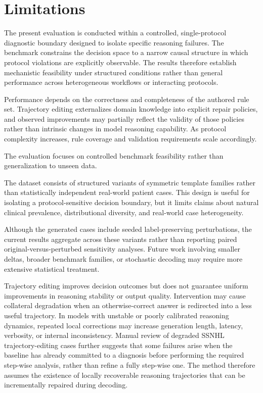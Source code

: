 \documentclass[twocolumn]{article}
\begin{document}
\section{Limitations}

The present evaluation is conducted within a controlled, single-protocol
diagnostic boundary designed to isolate specific reasoning failures. The
benchmark constrains the decision space to a narrow causal structure in which
protocol violations are explicitly observable. The results therefore establish
mechanistic feasibility under structured conditions rather than general
performance across heterogeneous workflows or interacting protocols.

Performance depends on the correctness and completeness of the authored rule
set. Trajectory editing externalizes domain knowledge into explicit repair
policies, and observed improvements may partially reflect the validity of those
policies rather than intrinsic changes in model reasoning capability. As
protocol complexity increases, rule coverage and validation requirements scale
accordingly.

The evaluation focuses on controlled benchmark feasibility rather than
generalization to unseen data.

The dataset consists of structured variants of symmetric template families
rather than statistically independent real-world patient cases. This design is
useful for isolating a protocol-sensitive decision boundary, but it limits claims
about natural clinical prevalence, distributional diversity, and real-world case
heterogeneity.

Although the generated cases include seeded label-preserving perturbations, the
current results aggregate across these variants rather than reporting paired
original-versus-perturbed sensitivity analyses. Future work involving smaller
deltas, broader benchmark families, or stochastic decoding may require more
extensive statistical treatment.

Trajectory editing improves decision outcomes but does not guarantee uniform
improvements in reasoning stability or output quality. Intervention may cause
collateral degradation when an otherwise-correct answer is redirected into a
less useful trajectory. In models with unstable or poorly calibrated reasoning
dynamics, repeated local corrections may increase generation length, latency,
verbosity, or internal inconsistency. Manual review of degraded SSNHL
trajectory-editing cases further suggests that some failures arise when the
baseline has already committed to a diagnosis before performing the required
step-wise analysis, rather than refine a fully step-wise one. The method
therefore assumes the existence of locally recoverable reasoning trajectories
that can be incrementally repaired during decoding.
\end{document}
